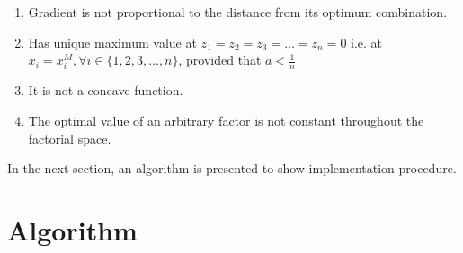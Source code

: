 \documentclass[twocolumn]{svjour3}          %
\begin{document}
\begin{enumerate}
	\item Gradient is not proportional to the distance from its optimum combination.
	\item Has unique maximum value at $z_1 = z_2 = z_3 = \dots = z_n = 0$ i.e. at $x_i=x_i^M, \forall i\in\{1, 2, 3, \dots, n\}$, provided that $a<\frac{1}{n}$
	\item It is not a concave function.
	\item The optimal value of an arbitrary factor is not constant throughout the factorial space.
\end{enumerate}
\par
In the next section, an algorithm is presented to show implementation procedure.
\section{Algorithm}
\label{Sec:Algorithm}
\end{document}
